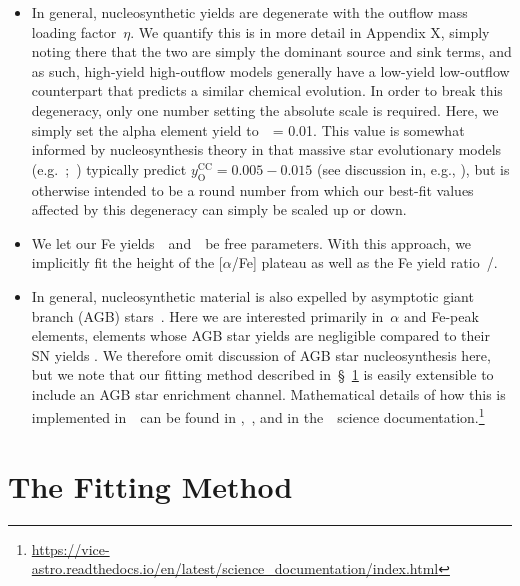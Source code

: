 \documentclass[ms.tex]{subfiles}
\begin{document}
\begin{itemize}

	\item In general, nucleosynthetic yields are degenerate with the outflow
	mass loading factor~$\eta$.
	We quantify this is in more detail in Appendix X, simply noting there that
	the two are simply the dominant source and sink terms, and as such,
	high-yield high-outflow models generally have a low-yield low-outflow
	counterpart that predicts a similar chemical evolution.
	In order to break this degeneracy, only one number setting the absolute
	scale is required.
	Here, we simply set the alpha element yield to~\yacc~= 0.01.
	This value is somewhat informed by nucleosynthesis theory in that
	massive star evolutionary models (e.g.~\citealp{Sukhbold2016,
	Limongi2018};~\citealp*{Nomoto2013}) typically predict
	$y_\text{O}^\text{CC} = 0.005 - 0.015$ (see discussion in, e.g.,
	\citealp{Weinberg2017, Johnson2020}), but is otherwise intended to be a
	round number from which our best-fit values affected by this degeneracy can
	simply be scaled up or down.

	\item We let our Fe yields~\yfecc~and~\yfeia~be free parameters.
	With this approach, we implicitly fit the height of the [$\alpha$/Fe]
	plateau as well as the Fe yield ratio~\yfecc/\yfeia.

	\item In general, nucleosynthetic material is also expelled by asymptotic
	giant branch (AGB) stars~\citep[e.g.][]{Cristallo2011, Cristallo2015,
	Ventura2013, Ventura2014, Ventura2018, Ventura2020, Karakas2016,
	Karakas2018}.
	Here we are interested primarily in~$\alpha$ and Fe-peak elements, elements
	whose AGB star yields are negligible compared to their SN yields
	\citep[e.g.][]{Johnson2019}.
	We therefore omit discussion of AGB star nucleosynthesis here, but we note
	that our fitting method described in~\S~\ref{sec:fitting} is easily
	extensible to include an AGB star enrichment channel.
	Mathematical details of how this is implemented in~\vice~can be found in
	\citet{Johnson2020},~\citet{Johnson2022}, and in the~\vice~science
	documentation.\footnote{
		\url{https://vice-astro.readthedocs.io/en/latest/science_documentation/index.html}
	}

\end{itemize}


\section{The Fitting Method}
\label{sec:fitting}
\end{document}
